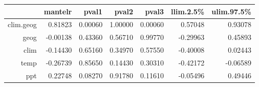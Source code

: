 \begin{table}[ht]
\centering
\begin{tabular}{rrrrrrr}
  \hline
 & mantelr & pval1 & pval2 & pval3 & llim.2.5\% & ulim.97.5\% \\ 
  \hline
clim.geog & 0.81823 & 0.00060 & 1.00000 & 0.00060 & 0.57048 & 0.93078 \\ 
  geog & -0.00138 & 0.43360 & 0.56710 & 0.99770 & -0.29963 & 0.45893 \\ 
  clim & -0.14430 & 0.65160 & 0.34970 & 0.57550 & -0.40008 & 0.02443 \\ 
  temp & -0.26739 & 0.85650 & 0.14430 & 0.30310 & -0.42172 & -0.06589 \\ 
  ppt & 0.22748 & 0.08270 & 0.91780 & 0.11610 & -0.05496 & 0.49446 \\ 
   \hline
\end{tabular}
\end{table}
